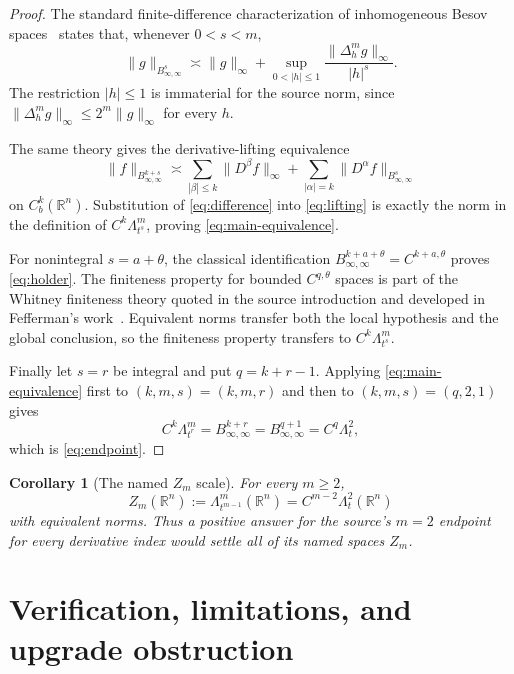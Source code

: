 \documentclass[11pt]{article}
\newtheorem{corollary}[theorem]{Corollary}
\newcommand{\R}{\mathbb R}
\newcommand{\Besov}[1]{B^{#1}_{\infty,\infty}}
\newcommand{\Diff}{\Delta}
\begin{document}
\begin{proof}
The standard finite-difference characterization of inhomogeneous Besov
spaces~\cite[finite-difference and lifting theorems]{Triebel1983} states that,
whenever $0<s<m$,
\begin{equation}\label{eq:difference}
 \|g\|_{\Besov{s}}
 \asymp \|g\|_\infty+
 \sup_{0<|h|\leq1}\frac{\|\Diff_h^m g\|_\infty}{|h|^s}.
\end{equation}
The restriction $|h|\leq1$ is immaterial for the source norm, since
$\|\Diff_h^m g\|_\infty\leq2^m\|g\|_\infty$ for every $h$.

The same theory gives the derivative-lifting equivalence
\begin{equation}\label{eq:lifting}
 \|f\|_{\Besov{k+s}}
 \asymp
 \sum_{|\beta|\leq k}\|D^\beta f\|_\infty
 +\sum_{|\alpha|=k}\|D^\alpha f\|_{\Besov{s}}
\end{equation}
on $C_b^k(\R^n)$.  Substitution of \eqref{eq:difference} into
\eqref{eq:lifting} is exactly the norm in the definition of
$C^k\Lambda^m_{t^s}$, proving \eqref{eq:main-equivalence}.

For nonintegral $s=a+\theta$, the classical identification
$\Besov{k+a+\theta}=C^{k+a,\theta}$ proves \eqref{eq:holder}.  The finiteness
property for bounded $C^{q,\theta}$ spaces is part of the Whitney finiteness
theory quoted in the source introduction and developed in
Fefferman's work~\cite{Fefferman2005,Fefferman2006}.  Equivalent norms
transfer both the local hypothesis and the global conclusion, so the
finiteness property transfers to $C^k\Lambda^m_{t^s}$.

Finally let $s=r$ be integral and put $q=k+r-1$.  Applying
\eqref{eq:main-equivalence} first to $(k,m,s)=(k,m,r)$ and then to
$(k,m,s)=(q,2,1)$ gives
\[
 C^k\Lambda^m_{t^r}=\Besov{k+r}
 =\Besov{q+1}=C^q\Lambda^2_t,
\]
which is \eqref{eq:endpoint}.
\end{proof}

\begin{corollary}[The named $Z_m$ scale]
For every $m\geq2$,
\[
 Z_m(\R^n):=\Lambda^m_{t^{m-1}}(\R^n)
 =C^{m-2}\Lambda^2_t(\R^n)
\]
with equivalent norms.  Thus a positive answer for the source's $m=2$
endpoint for every derivative index would settle all of its named spaces
$Z_m$.
\end{corollary}

\section*{Verification, limitations, and upgrade obstruction}
\end{document}
